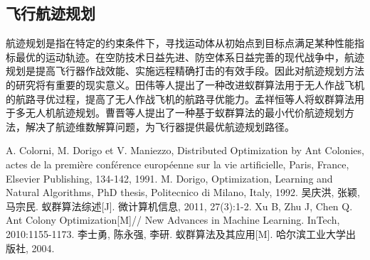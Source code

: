 \documentclass[12pt,nofonts]{ctexart}
\begin{document}
 \subsection{飞行航迹规划}
 航迹规划是指在特定的约束条件下，寻找运动体从初始点到目标点满足某种性能指标最优的运动轨迹。在空防技术日益先进、防空体系日益完善的现代战争中，航迹规划是提高飞行器作战效能、实施远程精确打击的有效手段。因此对航迹规划方法的研究将有重要的现实意义。田伟等人提出了一种改进蚁群算法用于无人作战飞机的航路寻优过程，提高了无人作战飞机的航路寻优能力。孟祥恒等人将蚁群算法用于多无人机航迹规划。曹晋等人提出了一种基于蚁群算法的最小代价航迹规划方法，解决了航迹维数解算问题，为飞行器提供最优航迹规划路径。
\begin{thebibliography}{99}
 A. Colorni, M. Dorigo et V. Maniezzo, Distributed Optimization by Ant Colonies, actes de la première conférence européenne sur la vie artificielle, Paris, France, Elsevier Publishing, 134-142, 1991.
 M. Dorigo, Optimization, Learning and Natural Algorithms, PhD thesis, Politecnico di Milano, Italy, 1992.
吴庆洪, 张颖, 马宗民. 蚁群算法综述[J]. 微计算机信息, 2011, 27(3):1-2.
Xu B, Zhu J, Chen Q. Ant Colony Optimization[M]// New Advances in Machine Learning. InTech, 2010:1155-1173.
李士勇, 陈永强, 李研. 蚁群算法及其应用[M]. 哈尔滨工业大学出版社, 2004.
\end{thebibliography}
\end{document}
